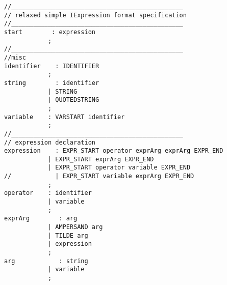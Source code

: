
\label{yaccexpr}

\begin{verbatim}
//_______________________________________________
// relaxed simple IExpression format specification
//_______________________________________________
start        : expression            
            ;
//_______________________________________________
//misc
identifier    : IDENTIFIER            
            ;
string        : identifier
            | STRING                
            | QUOTEDSTRING            
            ;
variable    : VARSTART identifier    
            ;
//_______________________________________________
// expression declaration
expression    : EXPR_START operator exprArg exprArg EXPR_END    
            | EXPR_START exprArg EXPR_END                    
            | EXPR_START operator variable EXPR_END            
//            | EXPR_START variable exprArg EXPR_END            
            ;
operator    : identifier
            | variable    
            ;
exprArg        : arg
            | AMPERSAND arg    
            | TILDE arg    
            | expression
            ;
arg            : string    
            | variable    
            ;
\end{verbatim}
